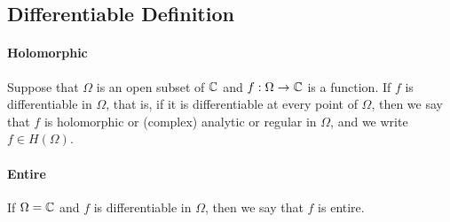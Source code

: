 \subsection{Differentiable Definition}
\paragraph{Holomorphic}
Suppose that \(\Omega\) is an open subset of \(\mathbb{C}\) and \(f:\Omega \to \mathbb{C}\) is a function. If \(f\) is differentiable in \(\Omega\), that is, if it is differentiable at every point of \(\Omega\), then we say that \(f\) is holomorphic or (complex) analytic or regular in \(\Omega\), and we write \(f \in H(\Omega)\).

\paragraph{Entire} If \(\Omega = \mathbb{C}\) and \(f\) is differentiable in \(\Omega\), then we say that \(f\) is entire.